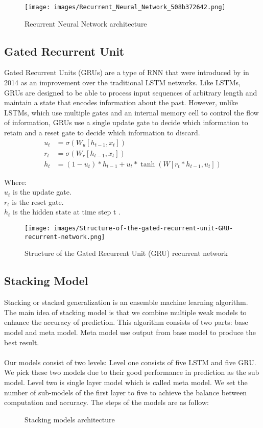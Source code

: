 \documentclass{ieeeojies}
\begin{document}
\begin{figure}[h!]
  \centering
  \texttt{[image: images/Recurrent\_Neural\_Network\_508b372642.png]}
  \caption{Recurrent Neural Network architecture}
  \label{fig:rnn_image}
\end{figure}
\subsection{Gated Recurrent Unit}
Gated Recurrent Units (GRUs) are a type of RNN that were introduced by in 2014 as an improvement over the traditional LSTM networks. Like LSTMs, GRUs are designed to be able to process input sequences of arbitrary length and maintain a state that encodes information about the past. However, unlike LSTMs, which use multiple gates and an internal memory cell to control the flow of information, GRUs use a single update gate to decide which information to retain and a reset gate to decide which information to discard.
\begin{align*}
        u_t &= \sigma(W_u [h_{t-1}, x_t]) \\
    r_t &= \sigma(W_r [h_{t-1}, x_t]) \\
    h_t &= (1 - u_t) \ast h_{t-1} + u_t \ast \tanh(W [r_t \ast h_{t-1}, u_t])
\end{align*}


Where: \\
\indent \textbullet \(u_t\) is the update gate.\\
\indent \textbullet \(r_t\) is the reset gate.\\
\indent \textbullet \(h_t\) is the hidden state at time step t .\\

\begin{figure}[h!]
  \centering
  \texttt{[image: images/Structure-of-the-gated-recurrent-unit-GRU-recurrent-network.png]}
  \caption{Structure of the Gated Recurrent Unit (GRU) recurrent network}
  \label{fig:gru_structure}
\end{figure}
\subsection{Stacking Model}
Stacking or stacked generalization is an ensemble machine learning algorithm. The main idea of stacking model is that we combine multiple weak models to enhance the accuracy of prediction. This algorithm consists of two parts: base model and meta model. Meta model use output from base model to produce the best result.\\ \\
Our models consist of two levels: Level one consists of five LSTM and five GRU. We pick these two models due to their good performance in prediction as the sub model. Level two is single layer model which is called meta model. We set the number of sub-models of the first layer to five to achieve the balance between computation and accuracy. The steps of the models are as follow:
\begin{figure}[h!]
  \centering
  
  \caption{Stacking models architecture}
  \label{fig:stacking_architecture}
\end{figure}
\end{document}
